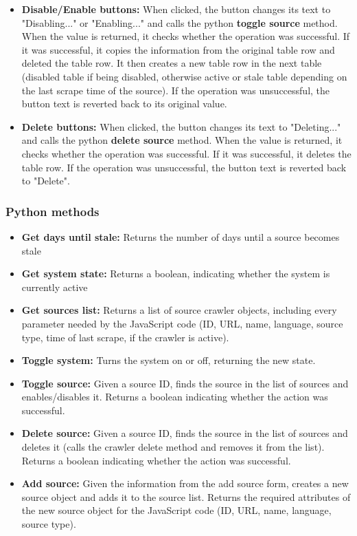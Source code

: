 \documentclass{l4proj}
\begin{document}
\begin{itemize}
    \item \textbf{Disable/Enable buttons: } When clicked, the button changes its text to "Disabling..." or "Enabling..." and calls the python \textbf{toggle source} method. When the value is returned, it checks whether the operation was successful. If it was successful, it copies the information from the original table row and deleted the table row. It then creates a new table row in the next table (disabled table if being disabled, otherwise active or stale table depending on the last scrape time of the source). If the operation was unsuccessful, the button text is reverted back to its original value.
    \item \textbf{Delete buttons: } When clicked, the button changes its text to "Deleting..." and calls the python \textbf{delete source} method. When the value is returned, it checks whether the operation was successful. If it was successful, it deletes the table row. If the operation was unsuccessful, the button text is reverted back to "Delete".
\end{itemize}
\hfill \par
\subsubsection{Python methods}
\begin{itemize}
    \item \textbf{Get days until stale: } Returns the number of days until a source becomes stale
    \item \textbf{Get system state: } Returns a boolean, indicating whether the system is currently active
    \item \textbf{Get sources list: } Returns a list of source crawler objects, including every parameter needed by the JavaScript code (ID, URL, name, language, source type, time of last scrape, if the crawler is active).
    \item \textbf{Toggle system: } Turns the system on or off, returning the new state.
    \item \textbf{Toggle source: } Given a source ID, finds the source in the list of sources and enables/disables it. Returns a boolean indicating whether the action was successful.
    \item \textbf{Delete source: } Given a source ID, finds the source in the list of sources and deletes it (calls the crawler delete method and removes it from the list). Returns a boolean indicating whether the action was successful.
    \item \textbf{Add source: } Given the information from the add source form, creates a new source object and adds it to the source list. Returns the required attributes of the new source object for the JavaScript code (ID, URL, name, language, source type).
\end{itemize}
\end{document}
